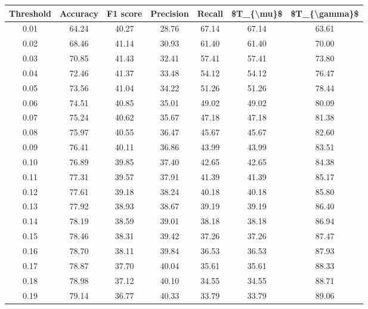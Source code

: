 \begin{tabular}{|c|c|c|c|c|c|c|}
\hline
 Threshold &  Accuracy &  F1 score &  Precision &  Recall &  \$T\_\{\textbackslash mu\}\$ &  \$T\_\{\textbackslash gamma\}\$ \\
\hline
      0.01 &     64.24 &     40.27 &      28.76 &   67.14 &      67.14 &         63.61 \\
      0.02 &     68.46 &     41.14 &      30.93 &   61.40 &      61.40 &         70.00 \\
      0.03 &     70.85 &     41.43 &      32.41 &   57.41 &      57.41 &         73.80 \\
      0.04 &     72.46 &     41.37 &      33.48 &   54.12 &      54.12 &         76.47 \\
      0.05 &     73.56 &     41.04 &      34.22 &   51.26 &      51.26 &         78.44 \\
      0.06 &     74.51 &     40.85 &      35.01 &   49.02 &      49.02 &         80.09 \\
      0.07 &     75.24 &     40.62 &      35.67 &   47.18 &      47.18 &         81.38 \\
      0.08 &     75.97 &     40.55 &      36.47 &   45.67 &      45.67 &         82.60 \\
      0.09 &     76.41 &     40.11 &      36.86 &   43.99 &      43.99 &         83.51 \\
      0.10 &     76.89 &     39.85 &      37.40 &   42.65 &      42.65 &         84.38 \\
      0.11 &     77.31 &     39.57 &      37.91 &   41.39 &      41.39 &         85.17 \\
      0.12 &     77.61 &     39.18 &      38.24 &   40.18 &      40.18 &         85.80 \\
      0.13 &     77.92 &     38.93 &      38.67 &   39.19 &      39.19 &         86.40 \\
      0.14 &     78.19 &     38.59 &      39.01 &   38.18 &      38.18 &         86.94 \\
      0.15 &     78.46 &     38.31 &      39.42 &   37.26 &      37.26 &         87.47 \\
      0.16 &     78.70 &     38.11 &      39.84 &   36.53 &      36.53 &         87.93 \\
      0.17 &     78.87 &     37.70 &      40.04 &   35.61 &      35.61 &         88.33 \\
      0.18 &     78.98 &     37.12 &      40.10 &   34.55 &      34.55 &         88.71 \\
      0.19 &     79.14 &     36.77 &      40.33 &   33.79 &      33.79 &         89.06 \\

\end{tabular}
